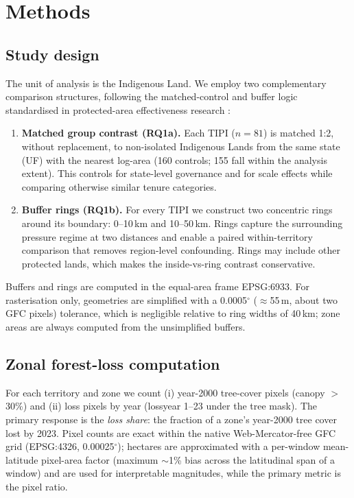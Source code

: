 \section{Methods}\label{sec:methods}

\subsection{Study design}
The unit of analysis is the Indigenous Land. We employ two complementary comparison structures, following the matched-control and buffer logic standardised in protected-area effectiveness research \citep{andam2008,joppa2010}:

\begin{enumerate}[leftmargin=1.4em, itemsep=1pt]
\item \textbf{Matched group contrast (RQ1a).} Each TIPI ($n=81$) is matched 1:2, without replacement, to non-isolated Indigenous Lands from the same state (UF) with the nearest log-area (160 controls; 155 fall within the analysis extent). This controls for state-level governance and for scale effects while comparing otherwise similar tenure categories.
\item \textbf{Buffer rings (RQ1b).} For every TIPI we construct two concentric rings around its boundary: 0--10\,km and 10--50\,km. Rings capture the surrounding pressure regime at two distances and enable a paired within-territory comparison that removes region-level confounding. Rings may include other protected lands, which makes the inside-vs-ring contrast conservative.
\end{enumerate}

Buffers and rings are computed in the equal-area frame EPSG:6933. For rasterisation only, geometries are simplified with a 0.0005$^\circ$ ($\approx$55\,m, about two GFC pixels) tolerance, which is negligible relative to ring widths of 40\,km; zone areas are always computed from the unsimplified buffers.

\subsection{Zonal forest-loss computation}
For each territory and zone we count (i) year-2000 tree-cover pixels (canopy $>$30\%) and (ii) loss pixels by year (lossyear 1--23 under the tree mask). The primary response is the \emph{loss share}: the fraction of a zone's year-2000 tree cover lost by 2023. Pixel counts are exact within the native Web-Mercator-free GFC grid (EPSG:4326, 0.00025$^\circ$); hectares are approximated with a per-window mean-latitude pixel-area factor (maximum $\sim$1\% bias across the latitudinal span of a window) and are used for interpretable magnitudes, while the primary metric is the pixel ratio.

